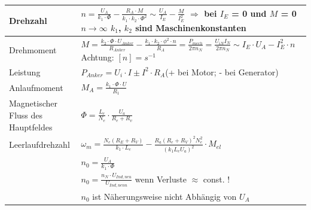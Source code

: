     	
        \renewcommand{\arraystretch}{1.5}
        \begin{tabular}[c]{ | p{6cm} | p{11cm} |}
            \hline
            Drehzahl &
            $ n= \frac{U_A}{k_1 \cdot \Phi} - \frac{R_A \cdot M}{k_1 \cdot k_2 \cdot \Phi^2} \sim \frac{U_A}{I_E} - \frac{M}{I_E^2}$ \newline
            $\Longrightarrow $ bei $I_E$ = 0 und $M$ = 0 $n \rightarrow \infty$ \newline 
            $k_1$, $k_2$ sind Maschinenkonstanten \\
            \hline
            Drehmoment &
            $M=\frac{k_2 \cdot \Phi \cdot U_{Anker}}{R_{Anker}} - \frac{k_1 \cdot k_2 \cdot\phi^2 \cdot n}{R_A} =\frac{P_{mech}}{2\pi n_N}=\frac{U_{iN}I_N}{2\pi n_N}\sim I_E \cdot U_A - I_E ^2 \cdot n$
            \quad Achtung: $[n] = s^{-1}$\\
            \hline
            Leistung &
            $P_{Anker}= U_i \cdot I \pm I^2 \cdot R_A $(+ bei Motor; - bei Generator) \\
            \hline
            Anlaufmoment &
            $M_A = \frac{k_1 \cdot \Phi \cdot U}{R_1}$ \\
            \hline
            Magnetischer Fluss des Hauptfeldes & 
            $\Phi=\frac{L_e}{N_e}\cdot\frac{U_a}{R_e+R_v}$\\
            \hline
            Leerlaufdrehzahl &
            $\omega_m=\frac{N_e\left(R_E+R_V\right)}{k_1\cdot
            L_e}-\frac{R_a\left(R_e+R_V\right)^2N_e^2}{\left(k_1L_eU_a\right)^2}\cdot
            M_{el}$\\
            & $n_0 = \frac{U_A}{k_1 \cdot \Phi}$ \\
            & $n_0 = \frac{n_N \cdot U_{Ind,neu}}{U_{Ind,nenn}}$  wenn Verluste $ \approx$ const. !\\
            & $n_0$ ist Näherungsweise nicht Abhängig von $U_A$ \\
            \hline
            
        \end{tabular}
        \renewcommand{\arraystretch}{1.3}
        
